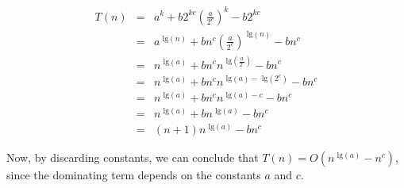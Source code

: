 \documentclass[11pt]{article}
\newcommand{\tlg}{\text{ lg}}
\begin{document}
\begin{sol}
\begin{eqnarray*}
T(n) & = & a^{k} + b2^{kc}(\frac{a}{2^c})^k - b2^{kc} \\
& = & a^{\tlg(n)} + bn^c(\frac{a}{2^c})^{\tlg(n)} - bn^c \\
& = & n^{\tlg(a)} + bn^cn^{\tlg(\frac{a}{2^c})} - bn^c \\ 
& = & n^{\tlg(a)} + bn^cn^{\tlg(a) - \tlg(2^c)} - bn^c \\
& = & n^{\tlg(a)} + bn^cn^{\tlg(a) - c} - bn^c \\
& = & n^{\tlg(a)} + bn^{\tlg(a)} - bn^c \\
& = & (n+1)n^{\tlg(a)} - bn^c
\end{eqnarray*}

Now, by discarding constants, we can conclude that $T(n) = O(n^{\tlg(a)} - n^c)$, since the dominating term depends on the constants $a$ and $c$.

\begin{comment}
Now we make the observation that $a^j(\frac{n}{2^j})^{c} = a^jn^c(\frac{1}{2^c})^j = a^jn^c(\frac{1}{2^j})^c = n^c(\frac{a}{2^c})^j$, so we can re-write the summation above as $n^{c}\sum_{j=0}^{k-1} (\frac{a}{2^c})^{j}$. We now have the following:

\begin{eqnarray*}
T(n) & =&  a^{k} + n^{c}b\sum_{j=0}^{k-1} (\frac{a}{2^c})^j \\
& = & a^{k} + n^{c}b\Bigg(\frac{(\frac{a}{2^c})^k - 1}{(\frac{a}{2^c}) - 1}\Bigg) \\
& = & a^{k} + \frac{bn^c(\frac{a}{2^c})^k}{(\frac{a}{2^c}) - 1} - \frac{bn^c}{(\frac{a}{2^c}) - 1}
\end{eqnarray*}

Now, we can observe that $a^{k} + \frac{bn^c(\frac{a}{2^c})^k}{(\frac{a}{2^c}) - 1} - \frac{bn^c}{(\frac{a}{2^c}) - 1} < a^{k} + bn^c(\frac{a}{2^c})^k$. Now, by replacing $k$ with $\tlg(n)$, we have the following:

\begin{eqnarray*}
T(n) <  a^{\tlg(n)} + bn^c(\frac{a}{2^c})^{\tlg(n)} & = & n^{\tlg(a)} + bn^cn^{\tlg(\frac{a}{2^c})} \\
& = & n^{\tlg(a)} + bn^cn^{\tlg(a) - \tlg(2^c)} \\
& = & n^{\tlg(a)} + bn^cn^{\tlg(a) - c} \\
& = & n^{\tlg(a)} + bn^{\tlg(a) - c + c} \\
& = & (b+1)n^{\tlg(a)}
\end{eqnarray*}

Therefore, we can conclude that $T(n) = O(n^{\tlg(a)})$.
\end{comment}

\end{sol}
\end{document}
